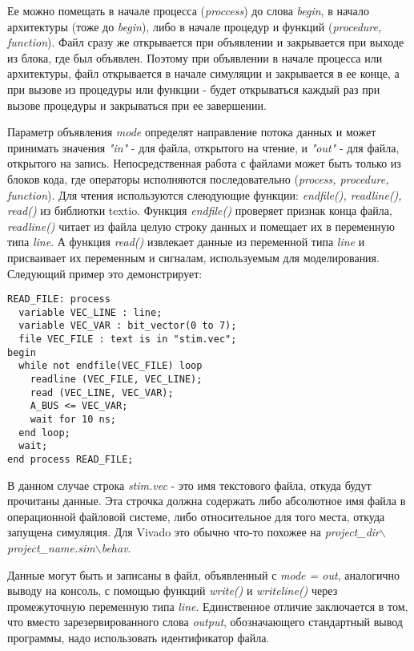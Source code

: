 Ее можно помещать в начале процесса (\emph{proccess}) до слова \emph{begin}, в начало архитектуры (тоже до \emph{begin}), либо в начале процедур и функций (\emph{procedure, function}). Файл сразу же открывается при объявлении и закрывается при выходе из блока, где был объявлен. Поэтому при объявлении в начале процесса или архитектуры, файл открывается в начале симуляции и закрывается в ее конце, а при вызове из процедуры или функции - будет открываться каждый раз при вызове процедуры и закрываться при ее завершении.

Параметр объявления \emph{mode} определят направление потока данных и может принимать значения \emph{"in"} - для файла, открытого на чтение, и \emph{"out"} - для файла, открытого на запись. Непосредственная работа с файлами может быть только из блоков кода, где операторы исполняются последовательно (\emph{process, procedure, function}). Для чтения используются слеюдующие функции: \emph{endfile(), readline(), read()} из библиотки textio. Функция \emph{endfile()} проверяет признак конца файла, \emph{readline()} читает из файла целую строку данных и помещает их в переменную типа \emph{line}. А функция \emph{read()} извлекает данные из переменной типа \emph{line} и присваивает их переменным и сигналам, используемым для моделирования. Следующий пример это демонстрирует:

\begin{Code}
\begin{lstlisting}
READ_FILE: process
  variable VEC_LINE : line;
  variable VEC_VAR : bit_vector(0 to 7);
  file VEC_FILE : text is in "stim.vec";
begin
  while not endfile(VEC_FILE) loop
    readline (VEC_FILE, VEC_LINE);
    read (VEC_LINE, VEC_VAR);
    A_BUS <= VEC_VAR;
    wait for 10 ns;
  end loop;
  wait;
end process READ_FILE;
\end{lstlisting}
\end{Code}

В данном случае строка \emph{stim.vec} - это имя текстового файла, откуда будут прочитаны данные. Эта строчка должна содержать либо абсолютное имя файла в операционной файловой системе, либо относительное для того места, откуда запущена симуляция. Для Vivado это обычно что-то похожее на \emph{project\_dir$\backslash$project\_name.sim$\backslash$behav}.

Данные могут быть и записаны в файл, объявленный с \emph{mode = out}, аналогично выводу на консоль, с помощью функций \emph{write()} и \emph{writeline()} через промежуточную переменную типа \emph{line}. Единственное отличие заключается в том, что вместо зарезервированного слова \emph{output}, обозначающего стандартный вывод программы, надо использовать идентификатор файла.

